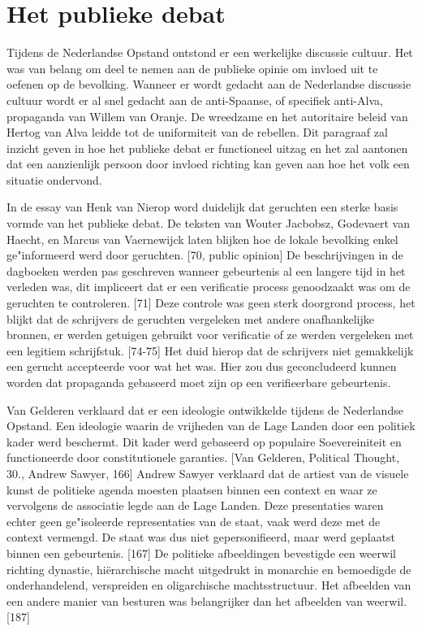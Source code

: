 \documentclass[11pt]{amsart}
\begin{document}
\section*{Het publieke debat}
\noindent  Tijdens de Nederlandse Opstand ontstond er een werkelijke discussie cultuur. Het was van belang om deel te nemen aan de
publieke opinie om invloed uit te oefenen op de bevolking. Wanneer er wordt gedacht aan de Nederlandse discussie cultuur wordt er al snel gedacht aan de anti-Spaanse, of specifiek anti-Alva, propaganda van Willem van Oranje. De wreedzame en het autoritaire beleid van Hertog van Alva leidde tot de uniformiteit van de rebellen. Dit paragraaf zal inzicht geven in hoe het publieke debat er functioneel uitzag en het zal aantonen dat een aanzienlijk persoon door invloed richting kan geven aan hoe het volk een situatie ondervond.

In de essay van Henk van Nierop word duidelijk dat geruchten een sterke basis vormde van het publieke debat. De teksten
van Wouter Jacbobsz, Godevaert van Haecht, en Marcus van Vaernewijck laten blijken hoe de lokale bevolking enkel
ge"informeerd werd door geruchten. [70, public opinion] De beschrijvingen in de dagboeken werden pas geschreven wanneer
gebeurtenis al een langere tijd in het verleden was, dit impliceert dat er een verificatie process genoodzaakt was om
de geruchten te controleren. [71] Deze controle was geen sterk doorgrond process, het blijkt dat de schrijvers de
geruchten vergeleken met andere onafhankelijke bronnen, er werden getuigen gebruikt voor verificatie of ze werden
vergeleken met een legitiem schrijfstuk. [74-75] Het duid hierop dat de schrijvers niet gemakkelijk een gerucht
accepteerde voor wat het was. Hier zou dus geconcludeerd kunnen worden dat propaganda gebaseerd moet zijn op een
verifieerbare gebeurtenis.

Van Gelderen verklaard dat er een ideologie ontwikkelde tijdens de Nederlandse Opstand. Een ideologie waarin de
vrijheden van de Lage Landen door een politiek kader werd beschermt. Dit kader werd gebaseerd op populaire
Soevereiniteit en functioneerde door constitutionele garanties. [Van Gelderen, Political Thought, 30., Andrew Sawyer,
          166] Andrew Sawyer verklaard dat de artiest van de visuele kunst de politieke agenda moesten plaatsen binnen een
context en waar ze vervolgens de associatie legde aan de Lage Landen. Deze presentaties waren echter geen ge"isoleerde
representaties van de staat, vaak werd deze met de context vermengd. De staat was dus niet gepersonifieerd, maar werd
geplaatst binnen een gebeurtenis. [167] De politieke afbeeldingen bevestigde een weerwil richting dynastie,
hiërarchische macht uitgedrukt in monarchie en bemoedigde de onderhandelend, verspreiden en oligarchische
machtsstructuur. Het afbeelden van een andere manier van besturen was belangrijker dan het afbeelden van weerwil. [187]
\end{document}
